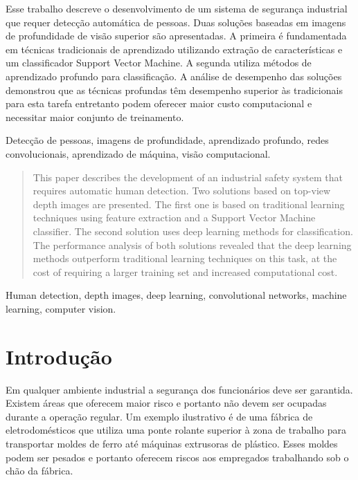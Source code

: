 \begin{resumo}
Esse trabalho descreve o desenvolvimento de um sistema de segurança industrial que requer detecção automática de pessoas. Duas soluções baseadas em imagens de profundidade de visão superior são apresentadas. A primeira é fundamentada em técnicas tradicionais de aprendizado utilizando extração de características e um classificador Support Vector Machine. A segunda utiliza métodos de aprendizado profundo para classificação. A análise de desempenho das soluções demonstrou que as técnicas profundas têm desempenho superior às tradicionais para esta tarefa entretanto podem oferecer maior custo computacional e necessitar maior conjunto de treinamento.
\end{resumo}

\begin{chave}
Detecção de pessoas, imagens de profundidade, aprendizado profundo, redes convolucionais, aprendizado de máquina, visão computacional.
\end{chave}

\begin{abstract}
This paper describes the development of an industrial safety system that requires automatic human detection. Two solutions based on top-view depth images are presented. The first one is based on traditional learning techniques using feature extraction and a Support Vector Machine classifier. The second solution uses deep learning methods for classification. The performance analysis of both solutions revealed that the deep learning methods outperform traditional learning techniques on this task, at the cost of requiring a larger training set and increased computational cost.
\end{abstract}

\begin{keywords}
  Human detection, depth images, deep learning, convolutional networks, machine learning, computer vision.
\end{keywords}

\section{Introdução}
  Em qualquer ambiente industrial a segurança dos funcionários deve ser garantida. Existem áreas que oferecem maior risco e portanto não devem ser ocupadas durante a operação regular. Um exemplo ilustrativo é de uma fábrica de eletrodomésticos que utiliza uma ponte rolante superior à zona de trabalho para transportar moldes de ferro até máquinas extrusoras de plástico. Esses moldes podem ser pesados e portanto oferecem riscos aos empregados trabalhando sob o chão da fábrica.

